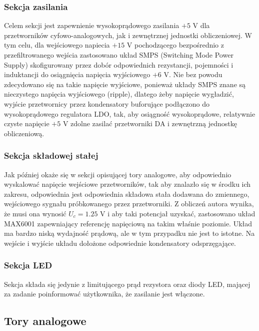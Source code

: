 \documentclass{scrartcl}
\begin{document}
\subsubsection{Sekcja zasilania}
Celem sekcji jest zapewnienie wysokoprądowego zasilania $+5$ V dla przetworników cyfowo-analogowych, jak i zewnętrznej jednostki obliczeniowej. W tym celu, dla wejściowego napiecia $+15$ V pochodzącego bezpośrednio z przefiltrowanego wejścia zastosowano układ SMPS (Switching Mode Power Supply) skofigurowany przez dobór odpowiednich rezystancji, pojemności i induktancji do osiągnięcia napięcia wyjściowego $+6$ V. Nie bez powodu zdecydowano się na takie napięcie wyjściowe, ponieważ układy SMPS znane są nieczystego napięcia wyjściowego (ripple), dlatego żeby napięcie wygładzić, wyjście przetwornicy przez kondensatory buforujące podłączono do wysokoprądowego regulatora LDO, tak, aby osiągność wysokoprądowe, relatywnie czyste napięcie $+5$ V zdolne zasilać przetworniki DA i zewnętrzną jednostkę obliczeniową.
\subsubsection{Sekcja składowej stałej}
Jak później okaże się w sekcji opisującej tory analogowe, aby odpowiednio wyskalować napięcie wejściowe przetworników, tak aby znalazło się w środku ich zakresu, odpowiednia jest odpowiednia składowa stała dodawana do zmiennego, wejściowego sygnału próbkowanego przez przetworniki. Z obliczeń autora wynika, że musi ona wynosić $U_c = 1.25$ V i aby taki potencjał uzyskać, zastosowano układ MAX6001 zapewniający referencję napięciową na takim właśnie poziomie. Układ ma bardzo niską wydajność prądową, ale w tym przypadku nie jest to istotne. Na wejście i wyjście układu dołożone odpowiednie kondensatory odsprzęgające.
\subsubsection{Sekcja LED}
Sekcja składa się jedynie z limitującego prąd rezystora oraz diody LED, mającej za zadanie poinformować użytkownika, że zasilanie jest włączone.
\newpage
\subsection{Tory analogowe}
\end{document}
